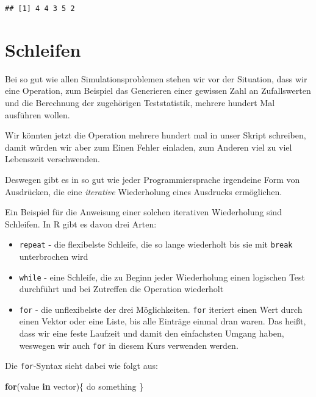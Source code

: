 \documentclass[
]{book}
\newenvironment{Shaded}{\begin{snugshade}}{\end{snugshade}}
\newcommand{\ControlFlowTok}[1]{\textcolor[rgb]{0.13,0.29,0.53}{\textbf{#1}}}
\newcommand{\NormalTok}[1]{#1}
\begin{document}
\begin{verbatim}
## [1] 4 4 3 5 2
\end{verbatim}

\hypertarget{schleifen}{%
\section{Schleifen}\label{schleifen}}

Bei so gut wie allen Simulationsproblemen stehen wir vor der Situation, dass wir eine Operation, zum Beispiel das Generieren einer gewissen Zahl an Zufallswerten und die Berechnung der zugehörigen Teststatistik, mehrere hundert Mal ausführen wollen.

Wir könnten jetzt die Operation mehrere hundert mal in unser Skript schreiben, damit würden wir aber zum Einen Fehler einladen, zum Anderen viel zu viel Lebenszeit verschwenden.

Deswegen gibt es in so gut wie jeder Programmiersprache irgendeine Form von Ausdrücken, die eine \emph{iterative} Wiederholung eines Ausdrucks ermöglichen.

Ein Beispiel für die Anweisung einer solchen iterativen Wiederholung sind Schleifen.
In R gibt es davon drei Arten:

\begin{itemize}
\item
  \texttt{repeat} - die flexibelste Schleife, die so lange wiederholt bis sie mit \texttt{break} unterbrochen wird
\item
  \texttt{while} - eine Schleife, die zu Beginn jeder Wiederholung einen logischen Test durchführt und bei Zutreffen die Operation wiederholt
\item
  \texttt{for} - die unflexibelste der drei Möglichkeiten. \texttt{for} iteriert einen Wert durch einen Vektor oder eine Liste, bis alle Einträge einmal dran waren. Das heißt, dass wir eine feste Laufzeit und damit den einfachsten Umgang haben, weswegen wir auch \texttt{for} in diesem Kurs verwenden werden.
\end{itemize}

Die \texttt{for}-Syntax sieht dabei wie folgt aus:

\begin{Shaded}
\begin{Highlighting}[]
\ControlFlowTok{for}\NormalTok{(value }\ControlFlowTok{in}\NormalTok{ vector)\{}
\NormalTok{  do something}
\NormalTok{\}}
\end{Highlighting}
\end{Shaded}
\end{document}
